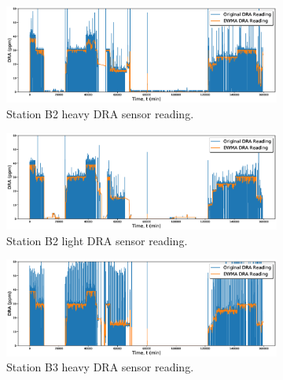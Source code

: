 \begin{figure}
     \centering
     \begin{subfigure}[b]{0.9\textwidth}
         \centering
         \includegraphics[width=\textwidth]{images/suncor/08CIGSour.eps}
         \caption{Station B2 heavy DRA sensor reading.}
         \label{fig:08Station B2heavy}
     \end{subfigure}
     \begin{subfigure}[b]{0.9\textwidth}
         \centering
         \includegraphics[width=\textwidth]{images/suncor/08CIGSweet.eps}
         \caption{Station B2 light DRA sensor reading.}
         \label{fig:08Station B2light}
     \end{subfigure}
     \begin{subfigure}[b]{0.9\textwidth}
         \centering
         \includegraphics[width=\textwidth]{images/suncor/08AultSour.eps}
         \caption{Station B3 heavy DRA sensor reading.}
         \label{fig:08Station B3heavy}
     \end{subfigure}
     \begin{subfigure}[b]{0.9\textwidth}
         \centering

\end{subfigure}
\end{figure}
